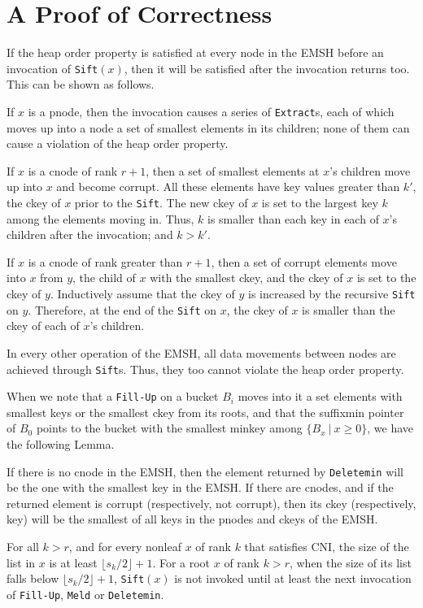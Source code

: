 \section{A Proof of Correctness}
\label{correct:emsh}
If the heap order property is satisfied at every node in the EMSH before an 
	invocation of {\tt Sift}$(x)$, then it will be satisfied after the
	invocation returns too.
This can be shown as follows.

If $x$ is a pnode, then the invocation causes a series of {\tt Extract}s, each
	of which moves up into a node a set of smallest elements in its children;
	none of them can cause a violation of the heap order property.

If $x$ is a cnode of rank $r+1$, then a set of smallest elements at $x$'s children
	move up into $x$ and become corrupt. 
All these elements have key values greater than $k'$, the ckey of $x$ prior to the {\tt Sift}.
The new ckey of $x$ is set to the largest key $k$ among the elements moving in. 
Thus, $k$ is smaller than each key in each of $x$'s
	children after the invocation; and $k>k'$. 

If $x$ is a cnode of rank greater than $r+1$, then a set of corrupt elements move
	into $x$ from $y$, the child of $x$ with the smallest ckey, and the ckey
	of $x$ is set to the ckey of $y$.
Inductively assume that the ckey of $y$ is increased by the recursive {\tt Sift} on $y$.  
Therefore, at the end of the {\tt Sift} on $x$, the ckey of $x$ is smaller than the
	ckey of each of $x$'s children.

In every other operation of the EMSH, all data movements between nodes 
	are achieved through {\tt Sift}s.
Thus, they too cannot violate the heap order property.

When we note that a {\tt Fill-Up} on a bucket $B_i$ moves into it
	a set elements with smallest keys or the smallest ckey from
	its roots, and that 
	the suffixmin pointer of $B_{0}$ points to the bucket with the smallest minkey
	among $\{B_{x}\ |\ x\geq 0\}$, we have the following Lemma. 

\begin{lemma}
If there is no cnode in the EMSH, then the element returned by {\tt Deletemin}
will be the one with the smallest key in the EMSH.
If there are cnodes, and if the returned element is corrupt (respectively, not corrupt), 
then its ckey (respectively, key) will be the smallest
of all keys in the pnodes and ckeys of the EMSH.
\end{lemma}

For all $k>r$, and for every nonleaf $x$ of rank $k$ that satisfies CNI, 
the size of the list in $x$ is at least $\lfloor s_k/2 \rfloor + 1$.
For a root $x$ of rank $k>r$, when the size of its list falls below $\lfloor s_k /2
	\rfloor + 1$, {\tt Sift}$(x)$ is not invoked until at least the next invocation
	of {\tt Fill-Up}, {\tt Meld} or {\tt Deletemin}.


